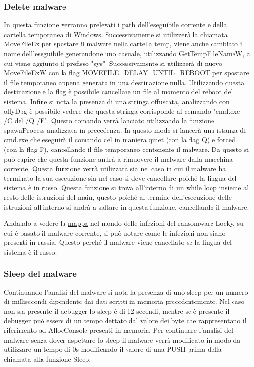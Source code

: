 \documentclass[a4paper,12pt]{article}
\begin{document}
\subsubsection{Delete malware}
In questa funzione verranno prelevati i path dell'eseguibile corrente e della cartella temporanea di Windows. Successivamente si utilizzerà la chiamata MoveFileEx per spostare il malware nella cartella temp, viene anche cambiato il nome dell'eseguibile generandone uno casuale, utilizzando GetTempFileNameW, a cui viene aggiunto il prefisso "sys".  Successivamente si utilizzerà di nuovo MoveFileExW con la flag MOVEFILE\_DELAY\_UNTIL\_REBOOT per spostare il file temporaneo appena generato in una destinazione nulla. Utilizzando questa destinazione e la flag è possibile cancellare un file al momento del reboot del sistema. 
Infine si nota la presenza di una stringa offuscata, analizzando con ollyDbg è possibile vedere che questa stringa corrisponde al comando "cmd.exe /C del /Q /F". Questo comando verrà lanciato utilizzando la funzione spawnProcess analizzata in precedenza. In questo modo si lancerà una istanza di cmd.exe che eseguirà il comando del in maniera quiet (con la flag Q) e forced (con la flag F), cancellando il file temporaneo contenente il malware. Da questo si può capire che questa funzione andrà a rimuovere il malware dalla macchina corrente. Questa funzione verrà utilizzata sia nel caso in cui il malware ha terminato la sua esecuzione sia nel caso si deve cancellare poiché la lingua del sistema è in russo.  Questa funzione si trova all'interno di un while loop insieme al resto delle istruzioni del main, questo poiché al termine dell'esecuzione delle istruzioni all'interno si andrà a saltare in questa funzione, cancellando il malware. 

Andando a vedere la \href{https://www.enterprisetimes.co.uk/2017/09/27/another-wave-locky-ransomware-arrives/}{mappa} nel mondo delle infezioni del ransomware Locky, su cui è basato il malware corrente, si può notare come le infezioni non siano presenti in russia. Questo perché il malware viene cancellato se la lingua del sistema è il russo.

\subsubsection{Sleep del malware}
Continuando l'analisi del malware si nota la presenza di uno sleep per un numero di millisecondi dipendente dai dati scritti in memoria precedentemente. Nel caso non sia presente il debugger lo sleep è di 12 secondi, mentre se è presente il debugger può essere di un tempo dettato dal valore dei byte che rappresentano il riferimento ad AllocConsole presenti in memoria. 
Per continuare l'analisi del malware senza dover aspettare lo sleep il malware verrà modificato in modo da utilizzare un tempo di 0s modificando il valore di una PUSH prima della chiamata alla funzione Sleep. 
\end{document}
